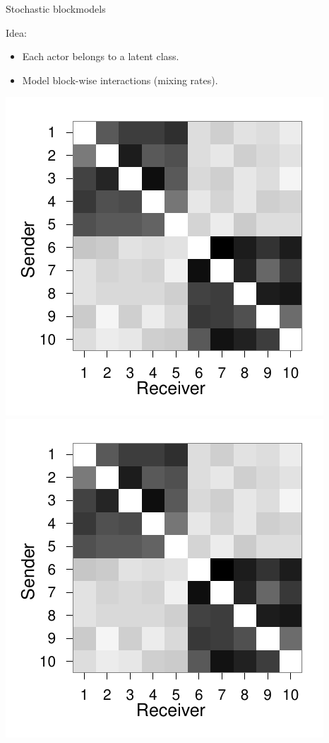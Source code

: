 \documentclass{beamer}
\begin{document}
\begin{frame}{Stochastic blockmodels}

Idea: 
\begin{itemize}
\item Each actor belongs to a latent class. 
\item Model block-wise interactions (mixing rates).
\end{itemize}

\includegraphics[scale=.5]{../../figs/synthetic/mat}
\includegraphics[scale=.5]{../../figs/synthetic/mat}

\end{frame}
\end{document}
